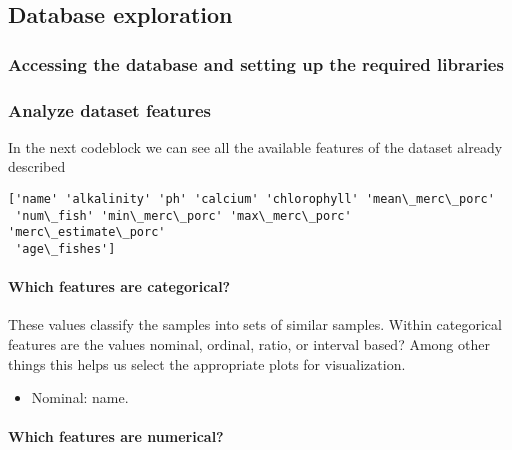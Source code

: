 \documentclass[11pt]{article}
\providecommand{\tightlist}{%
      \setlength{\itemsep}{0pt}\setlength{\parskip}{0pt}}
\begin{document}
    \hypertarget{database-exploration}{%
\subsection{Database exploration}\label{database-exploration}}

\hypertarget{accessing-the-database-and-setting-up-the-required-libraries}{%
\subsubsection{Accessing the database and setting up the required
libraries}\label{accessing-the-database-and-setting-up-the-required-libraries}}

    \hypertarget{analyze-dataset-features}{%
\subsubsection{Analyze dataset
features}\label{analyze-dataset-features}}

In the next codeblock we can see all the available features of the
dataset already described

    \begin{Verbatim}[commandchars=\\\{\}]
['name' 'alkalinity' 'ph' 'calcium' 'chlorophyll' 'mean\_merc\_porc'
 'num\_fish' 'min\_merc\_porc' 'max\_merc\_porc' 'merc\_estimate\_porc'
 'age\_fishes']
    \end{Verbatim}

    \hypertarget{which-features-are-categorical}{%
\paragraph{Which features are
categorical?}\label{which-features-are-categorical}}

These values classify the samples into sets of similar samples. Within
categorical features are the values nominal, ordinal, ratio, or interval
based? Among other things this helps us select the appropriate plots for
visualization.

\begin{itemize}
\tightlist
\item
  Nominal: name.
\end{itemize}

\hypertarget{which-features-are-numerical}{%
\paragraph{Which features are
numerical?}\label{which-features-are-numerical}}
\end{document}
